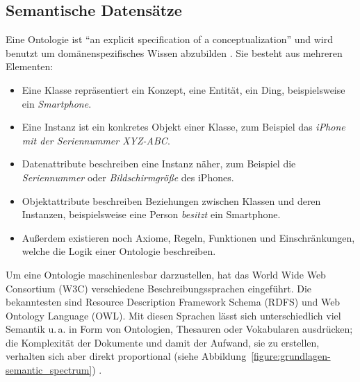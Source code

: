 \documentclass[
	headsepline,
	footsepline,
	fontsize=12pt,
	bibliography=totoc
]{scrbook}
\begin{document}







\subsection{Semantische Datensätze}
\label{section:semantische_daten}

Eine Ontologie ist \enquote{an explicit specification of a conceptualization} \cite{Gruber1995} und wird benutzt um domänenspezifisches Wissen abzubilden \cite{Chandrasekaran1999}. Sie besteht aus mehreren Elementen:

\begin{itemize}
	\item Eine Klasse repräsentiert ein Konzept, eine Entität, ein Ding, beispielsweise ein \textit{Smartphone}.
	\item Eine Instanz ist ein konkretes Objekt einer Klasse, zum Beispiel das \textit{iPhone mit der Seriennummer XYZ-ABC}.
	\item Datenattribute beschreiben eine Instanz näher, zum Beispiel die \textit{Seriennummer} oder \textit{Bildschirmgröße} des iPhones.
	\item Objektattribute beschreiben Beziehungen zwischen Klassen und deren Instanzen, beispielsweise eine Person \textit{besitzt} ein Smartphone.
	\item Außerdem existieren noch Axiome, Regeln, Funktionen und Einschränkungen, welche die Logik einer Ontologie beschreiben.
\end{itemize}

Um eine Ontologie maschinenlesbar darzustellen, hat das World Wide Web Consortium (W3C) verschiedene Beschreibungssprachen eingeführt. Die bekanntesten sind Resource Description Framework Schema (RDFS) und Web Ontology Language (OWL). Mit diesen Sprachen lässt sich unterschiedlich viel Semantik u.\,a. in Form von Ontologien, Thesauren oder Vokabularen ausdrücken; die Komplexität der Dokumente und damit der Aufwand, sie zu erstellen, verhalten sich aber direkt proportional (siehe Abbildung~\ref{figure:grundlagen-semantic_spectrum}) \cite{Bergman2007}.
\end{document}
